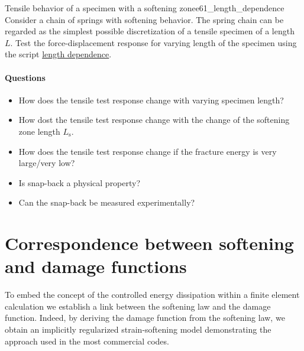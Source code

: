 \documentclass[main.tex]{subfiles}
\begin{document}
\begin{bmcsex}{Tensile behavior of a specimen with a softening zone}{e61_length_dependence}
Consider a chain of springs with softening behavior. The spring chain can be regarded as the simplest possible discretization of a tensile specimen of a length $L$. Test the force-displacement response for varying length of the specimen using the script \href{https://wiki.imb.rwth-aachen.de/do/view/IMB/Teaching/TeachExampleObj0017}{length dependence}.

\paragraph{Questions}
\begin{itemize}
\item
How does the tensile test response change with varying specimen length?
\item
How dost the tensile test response change with the change of the softening zone length $L_\mathrm{s}$.
\item
How does the tensile test response change if the fracture energy is very large/very low? 
\item
Is snap-back a physical property? 
\item
Can the snap-back be measured experimentally?
\end{itemize}

\end{bmcsex}

\section{Correspondence between softening and damage functions}

To embed the concept of the controlled energy dissipation within a finite element calculation we establish a link between the softening law and the damage function. Indeed, by deriving the damage function from the softening law, we obtain an implicitly regularized strain-softening model demonstrating the approach used in the most commercial codes.
\end{document}
